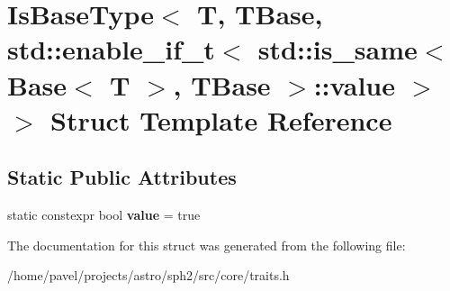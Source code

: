 \hypertarget{structIsBaseType_3_01T_00_01TBase_00_01std_1_1enable__if__t_3_01std_1_1is__same_3_01Base_3_01T_0c0a7ea670c56e23cbe6d6f78f2838e45}{}\section{Is\+Base\+Type$<$ T, T\+Base, std\+:\+:enable\+\_\+if\+\_\+t$<$ std\+:\+:is\+\_\+same$<$ Base$<$ T $>$, T\+Base $>$\+:\+:value $>$ $>$ Struct Template Reference}
\label{structIsBaseType_3_01T_00_01TBase_00_01std_1_1enable__if__t_3_01std_1_1is__same_3_01Base_3_01T_0c0a7ea670c56e23cbe6d6f78f2838e45}
\subsection*{Static Public Attributes}
\begin{DoxyCompactItemize}
\item 
\hypertarget{structIsBaseType_3_01T_00_01TBase_00_01std_1_1enable__if__t_3_01std_1_1is__same_3_01Base_3_01T_0c0a7ea670c56e23cbe6d6f78f2838e45_a36f202b553ef5cc569102f67623a2857}{}\label{structIsBaseType_3_01T_00_01TBase_00_01std_1_1enable__if__t_3_01std_1_1is__same_3_01Base_3_01T_0c0a7ea670c56e23cbe6d6f78f2838e45_a36f202b553ef5cc569102f67623a2857} 
static constexpr bool {\bfseries value} = true
\end{DoxyCompactItemize}


The documentation for this struct was generated from the following file\+:\begin{DoxyCompactItemize}
\item 
/home/pavel/projects/astro/sph2/src/core/traits.\+h\end{DoxyCompactItemize}

